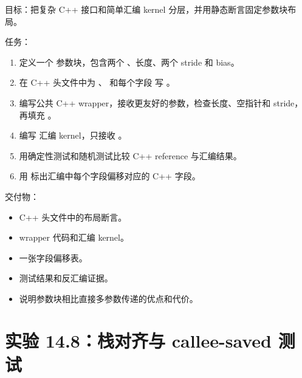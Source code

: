 \begin{labbox}
目标：把复杂 C++ 接口和简单汇编 kernel 分层，并用静态断言固定参数块布局。

任务：

\begin{enumerate}
  \item 定义一个  参数块，包含两个 、长度、两个 stride 和 bias。
  \item 在 C++ 头文件中为 、 和每个字段  写 。
  \item 编写公共 C++ wrapper，接收更友好的参数，检查长度、空指针和 stride，再填充 。
  \item 编写  汇编 kernel，只接收 。
  \item 用确定性测试和随机测试比较 C++ reference 与汇编结果。
  \item 用  标出汇编中每个字段偏移对应的 C++ 字段。
\end{enumerate}

交付物：

\begin{itemize}
  \item C++ 头文件中的布局断言。
  \item wrapper 代码和汇编 kernel。
  \item 一张字段偏移表。
  \item 测试结果和反汇编证据。
  \item 说明参数块相比直接多参数传递的优点和代价。
\end{itemize}
\end{labbox}

\section{实验 14.8：栈对齐与 callee-saved 测试}

